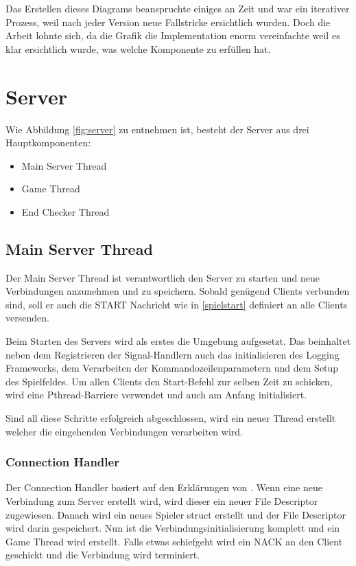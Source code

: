 Das Erstellen dieses Diagrams beanspruchte einiges an Zeit und war ein iterativer Prozess, weil nach jeder Version neue Fallstricke ersichtlich wurden. Doch die Arbeit lohnte sich, da die Grafik die Implementation enorm vereinfachte weil es klar ersichtlich wurde, was welche Komponente zu erfüllen hat.

\section{Server}
Wie Abbildung \ref{fig:server} zu entnehmen ist, besteht der Server aus drei Hauptkomponenten:
\begin{itemize}
	\item Main Server Thread
	\item Game Thread
	\item End Checker Thread
\end{itemize}

\subsection{Main Server Thread}
Der Main Server Thread ist verantwortlich den Server zu starten und neue Verbindungen anzunehmen und zu speichern. Sobald genügend Clients verbunden sind, soll er auch die START Nachricht wie in \ref{spielstart} definiert an alle Clients versenden.

Beim Starten des Servers wird als erstes die Umgebung aufgesetzt. Das beinhaltet neben dem Registrieren der Signal-Handlern auch das initialisieren des Logging Frameworks, dem Verarbeiten der Kommandozeilenparametern und dem Setup des Spielfeldes. Um allen Clients den Start-Befehl zur selben Zeit zu schicken, wird eine Pthread-Barriere verwendet und auch am Anfang initialisiert.

Sind all diese Schritte erfolgreich abgeschlossen, wird ein neuer Thread erstellt welcher die eingehenden Verbindungen verarbeiten wird. 

\subsubsection{Connection Handler}
Der Connection Handler basiert auf den Erklärungen von \cite{byte-stream-server}. Wenn eine neue Verbindung zum Server erstellt wird, wird dieser ein neuer File Descriptor zugewiesen. 	Danach wird ein neues Spieler struct erstellt und der File Descriptor wird darin gespeichert. Nun ist die Verbindungsinitialisierung komplett und ein Game Thread wird erstellt. Falls etwas schiefgeht wird ein NACK an den Client geschickt und die Verbindung wird terminiert.

